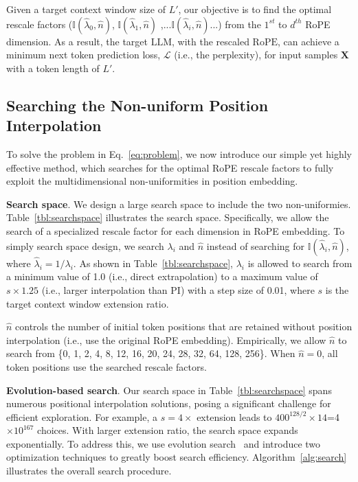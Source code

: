 Given a target context window size of $L'$, our objective is to find the optimal rescale factors ($\mathbb{I}(\hat{\lambda}_{0},\hat{n})$, $\mathbb{I}(\hat{\lambda}_{1},\hat{n})$ ,...$\mathbb{I}(\hat{\lambda}_{i},\hat{n})$...) from the $1^{st}$ to $d^{th}$ RoPE dimension. As a result, the target $\text{LLM}$, with the rescaled $\text{RoPE}$, can achieve a minimum next token prediction loss, $\mathcal{L}$ (i.e., the perplexity), for input samples $\mathbf{X}$ with a token length of $L'$. 

\subsection{Searching the Non-uniform Position Interpolation}

To solve the problem in Eq.~\ref{eq:problem}, we now introduce our simple yet highly effective method, which searches for the optimal RoPE rescale factors to fully exploit the multidimensional non-uniformities in position embedding. 

\textbf{Search space}. We  design a large search space to include the two non-uniformies.  Table~\ref{tbl:searchspace} illustrates the search space.  Specifically, we allow the search of a specialized rescale factor for each dimension in RoPE embedding. To simply search space design, we search $\lambda_i$ and $\hat{n}$ instead of searching for $\mathbb{I}(\hat{\lambda}_{i},\hat{n})$, where  $\hat{\lambda}_{i}=1/\lambda_i$. 
 As shown in Table~\ref{tbl:searchspace}, $\lambda_i$ is allowed to search from a minimum value of 1.0 (i.e., direct extrapolation) to a maximum value of $s\times1.25$ (i.e., larger interpolation than PI) with a step size of 0.01, where $s$ is the target context window extension ratio.

$\hat{n}$ controls the number of initial token positions that are retained without position interpolation (i.e., use the original RoPE embedding). Empirically, we allow $\hat{n}$ to search from \{0, 1, 2, 4, 8, 12, 16, 20, 24, 28, 32, 64, 128, 256\}. When $\hat{n}=0$, all token positions use the searched rescale factors.

\textbf{Evolution-based search}. Our search space in Table~\ref{tbl:searchspace} spans numerous positional interpolation solutions, posing a significant challenge for efficient exploration.  For example, a $s=4\times$ extension leads to  $400^{128/2}\times14$=4$\times10^{167}$ choices. With larger extension ratio,  the search space  expands exponentially. To address this, we use evolution search~\cite{guo2020single}  and introduce  two optimization techniques to greatly boost search efficiency. Algorithm~\ref{alg:search} illustrates the overall search procedure. 

